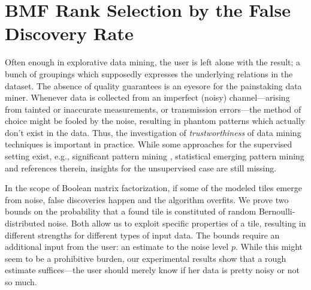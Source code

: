 \chapter{BMF Rank Selection by the False Discovery Rate}

Often enough in explorative data mining, the user is left alone with the result; a bunch of groupings which supposedly expresses the underlying relations in the dataset. The absence of quality guarantees is an eyesore for the painstaking data miner.
Whenever data is collected from an imperfect (noisy) channel---arising from tainted or inaccurate measurements, or transmission errors---the method of choice might be fooled by the noise, resulting in phantom patterns which actually don't exist in the data. Thus, the investigation of \emph{trustworthiness} of data mining techniques is important in practice. While some approaches for the supervised setting exist, e.g., significant pattern mining \cite{llinares2015fast}, statistical emerging pattern mining \cite{komiyama2017statistical} and references therein, insights for the unsupervised case are still missing. 

In the scope of Boolean matrix factorization, if some of the modeled tiles emerge from noise, false discoveries happen and the algorithm overfits.
We prove two bounds on the probability that a found tile is constituted of random Bernoulli-distributed noise. Both allow us to exploit specific properties of a tile, resulting in different strengths for different types of input data.
The bounds require an additional input from the user: an estimate to the noise level $p$. While this might seem to be a prohibitive burden, our experimental results show that a rough estimate suffices---the user should merely know if her data is pretty noisy or not so much.

